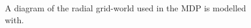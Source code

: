 \documentclass{article}
\begin{document}
\begin{figure}  
  \centering
  
\caption{A diagram of the radial grid-world used in the MDP is modelled with. }\label{fig:environment}
\end{figure}
\end{document}
